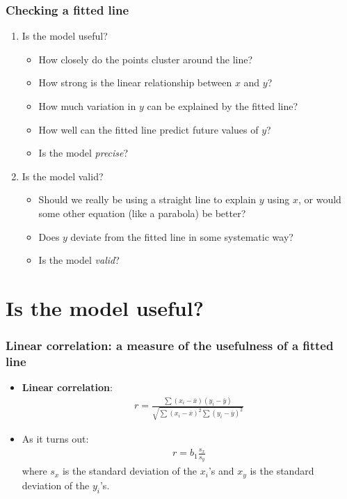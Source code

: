 \documentclass[handout]{beamer}
\providecommand{\ov}[1]{\overline{#1}}
\numberwithin{equation}{section}
\begin{document}
\begin{frame}
\frametitle{Checking a fitted line}

\begin{enumerate}[1. ]
\pause \item Is the model useful?
\begin{itemize}
\pause \item How closely do the points cluster around the line?
\pause \item How strong is the linear relationship between $x$ and $y$?
\pause \item How much variation in $y$ can be explained by the fitted line?
\pause \item How well can the fitted line predict future values of $y$?
\pause \item Is the model \emph{precise}?
\end{itemize}
\pause \item Is the model valid?
\begin{itemize}
\pause \item Should we really be using a straight line to explain $y$ using $x$, or would some other equation (like a parabola) be better?
\pause \item Does $y$ deviate from the fitted line in some systematic way?
\pause \item Is the model \emph{valid}?
\end{itemize}
\end{enumerate}
\end{frame}


\section{Is the model useful?}

\begin{frame}
\frametitle{Linear correlation: a measure of the usefulness of a fitted line}
\begin{itemize}
\pause \item {\bf Linear correlation}:
\pause \begin{align*}
r = \frac{\sum(x_i - \ov{x})(y_i - \ov{y})}{\sqrt{\sum (x_i - \ov{x})^2 \sum (y_i - \ov{y})^2}}
\end{align*}
\pause \item As it turns out:
\pause \begin{align*}
r = b_1\frac{s_x}{s_y}
\end{align*}
\pause where $s_x$ is the standard deviation of the $x_i$'s and $x_y$ is the standard deviation of the $y_i$'s.
\end{itemize}
\end{frame}
\end{document}
